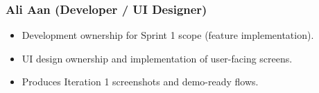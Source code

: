 \documentclass[11pt, legalpaper]{article}
\begin{document}
\subsubsection*{Ali Aan \normalfont\small\color{muted}(Developer / UI Designer)}
\begin{itemize}
  \item Development ownership for Sprint 1 scope (feature implementation).
  \item UI design ownership and implementation of user-facing screens.
  \item Produces Iteration 1 screenshots and demo-ready flows.
\end{itemize}
\end{document}
